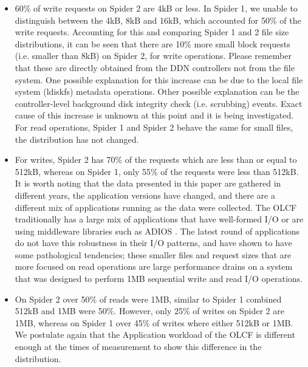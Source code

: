 \begin{itemize}

\item  60\% of write requests on Spider 2 are 4kB or less.  In Spider 1, we
unable to distinguish between the 4kB, 8kB and 16kB, which accounted for 50\%
of the write requests. Accounting for this and comparing Spider 1 and 2 file
size distributions, it can be seen that there are 10\% more small block requests (i.e.
smaller than 8kB) on Spider 2, for write operations. Please remember that these
are directly obtained from the DDN controllers not from the file system. One
possible explanation for this increase can be due to the local file system
(ldiskfs) metadata operations. Other possible explanation can be the
controller-level background disk integrity check (i.e. scrubbing) events. Exact
cause of this increase is unknown at this point and it is being investigated.
For read operations, Spider 1 and Spider 2 behave the same for small files, the
distribution has not changed.

\item  For writes, Spider 2 has 70\% of the requests which are less than or
equal to 512kB, whereas on Spider 1, only 55\% of the requests were less than
512kB. It is worth noting that the data presented in this paper are gathered in 
different years, the application versions have changed, and there are a different
mix of applications running as the data were collected. The OLCF traditionally has 
a large mix of applications that have well-formed I/O or are using middleware 
libraries such as ADIOS \cite{adios}. The latest round of applications do not have 
this robustness in their I/O patterns, and have shown to have some pathological 
tendencies; these smaller files and request sizes that are more focused on read 
operations are large performance drains on a system that was designed to perform 
1MB sequential write and read I/O operations. 

\item On Spider 2 over 50\% of reads were 1MB, similar to Spider 1 combined
512kB and 1MB were 50\%. However, only 25\% of writes on Spider 2 are 1MB,
whereas on Spider 1 over 45\% of writes where either 512kB or 1MB. We postulate 
again that the Application workload of the OLCF is different enough at the times of 
measurement to show this difference in the distribution.


\end{itemize}

